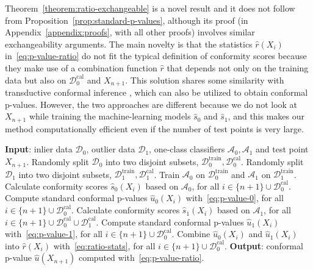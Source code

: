 \documentclass[11pt]{article}
\begin{document}
Theorem~\ref{theorem:ratio-exchangeable} is a novel result and it does not follow from Proposition~\ref{prop:standard-p-values}, although its proof (in Appendix~\ref{appendix:proofs}, with all other proofs) involves similar exchangeability arguments.
The main novelty is that the statistics $\hat{r}(X_i)$ in~\eqref{eq:p-value-ratio} do not fit the typical definition of conformity scores because they make use of a combination function $\hat{r}$ that depends not only on the training data but also on $\mathcal{D}_0^{\mathrm{cal}}$ and $X_{n+1}$.
This solution shares some similarity with transductive conformal inference \cite{vovk2013transductive}, which can also be utilized to obtain conformal p-values. However, the two approaches are different because we do not look at $X_{n+1}$ while training the machine-learning models $\hat{s}_0$ and $\hat{s}_1$, and this makes our method computationally efficient even if the number of test points is very large.

\begin{algorithm}[H]
    \caption{Integrative conformal p-values}
    \label{alg:weighted-pvalues}
    \begin{algorithmic}[1]
        \State \textbf{Input}: inlier data $\mathcal{D}_0$, outlier data $\mathcal{D}_1$, one-class classifiers $\mathcal{A}_0, \mathcal{A}_1$ and test point $X_{n+1}$.
        \State Randomly split $\mathcal{D}_0$ into two disjoint subsets, $\mathcal{D}_0^{\mathrm{train}}, \mathcal{D}_0^{\mathrm{cal}}$.
        \State Randomly split $\mathcal{D}_1$ into two disjoint subsets, $\mathcal{D}_1^{\mathrm{train}}, \mathcal{D}_1^{\mathrm{cal}}$.
        \State Train $\mathcal{A}_0$ on $\mathcal{D}_0^{\mathrm{train}}$ and $\mathcal{A}_1$ on $\mathcal{D}_1^{\mathrm{train}}$.
        \State Calculate conformity scores $\hat{s}_0(X_i)$ based on $\mathcal{A}_0$, for all $i \in \{n+1\} \cup \mathcal{D}^{\mathrm{cal}}_0$.
        \State Compute standard conformal p-values $\hat{u}_0(X_i)$ with~\eqref{eq:p-value-0}, for all $i \in \{n+1\} \cup \mathcal{D}^{\mathrm{cal}}_0$.
        \State Calculate conformity scores $\hat{s}_1(X_i)$ based on $\mathcal{A}_1$, for all $i \in \{n+1\} \cup \mathcal{D}^{\mathrm{cal}}_0 \cup \mathcal{D}^{\mathrm{cal}}_1$.
        \State Compute standard conformal p-values $\hat{u}_1(X_i)$ with~\eqref{eq:p-value-1}, for all $i \in \{n+1\} \cup \mathcal{D}^{\mathrm{cal}}_0$.
        \State Combine $\hat{u}_0(X_i)$ and $\hat{u}_1(X_i)$ into $\hat{r}(X_i)$ with~\eqref{eq:ratio-stats}, for all $i \in \{n+1\} \cup \mathcal{D}^{\mathrm{cal}}_0$.
        \State \textbf{Output}: conformal p-value $\hat{u}(X_{n+1})$ computed with~\eqref{eq:p-value-ratio}.
    \end{algorithmic}
\end{algorithm}
\end{document}
